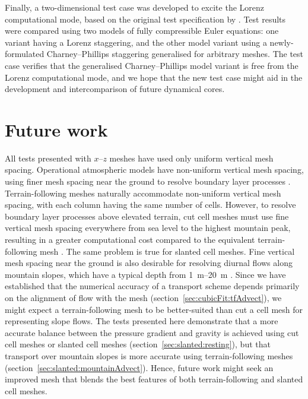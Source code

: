 Finally, a two-dimensional test case was developed to excite the Lorenz computational mode, based on the original test specification by \citet{arakawa-konor1996}. 
Test results were compared using two models of fully compressible Euler equations: one variant having a Lorenz staggering, and the other model variant using a newly-formulated Charney--Phillips staggering generalised for arbitrary meshes.
The test case verifies that the generalised Charney--Phillips model variant is free from the Lorenz computational mode, and we hope that the new test case might aid in the development and intercomparison of future dynamical cores.

\section{Future work}

All tests presented with $x$--$z$ meshes have used only uniform vertical mesh spacing.
Operational atmospheric models have non-uniform vertical mesh spacing, using finer mesh spacing near the ground to resolve boundary layer processes \citep[p. 547]{chow2013}.
Terrain-following meshes naturally accommodate non-uniform vertical mesh spacing, with each column having the same number of cells.
However, to resolve boundary layer processes above elevated terrain, cut cell meshes must use fine vertical mesh spacing everywhere from sea level to the highest mountain peak, resulting in a greater computational cost compared to the equivalent terrain-following mesh \citep{walko-avissar2008b}.
The same problem is true for slanted cell meshes.
Fine vertical mesh spacing near the ground is also desirable for resolving diurnal flows along mountain slopes, which have a typical depth from \SIrange{1}{20}{\meter} \citep[p. 39]{chow2013}.
Since we have established that the numerical accuracy of a transport scheme depends primarily on the alignment of flow with the mesh (section~\ref{sec:cubicFit:tfAdvect}), we might expect a terrain-following mesh to be better-suited than cut a cell mesh for representing slope flows.
The tests presented here demonstrate that a more accurate balance between the pressure gradient and gravity is achieved using cut cell meshes or slanted cell meshes (section~\ref{sec:slanted:resting}), but that transport over mountain slopes is more accurate using terrain-following meshes (section~\ref{sec:slanted:mountainAdvect}).
Hence, future work might seek an improved mesh that blends the best features of both terrain-following and slanted cell meshes.

